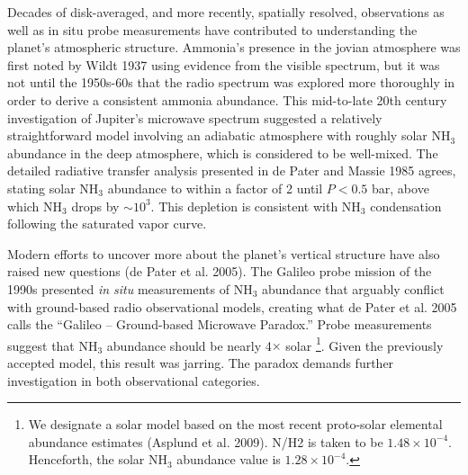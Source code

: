 \documentclass{article}
\newcommand{\e}[1]{\times 10^{#1}}
\begin{document}
	Decades of disk-averaged, and more recently, spatially resolved, observations as well as in situ probe measurements have contributed to understanding the planet's atmospheric structure.
	Ammonia's presence in the jovian atmosphere was first noted by Wildt 1937 using evidence from the visible spectrum, but it was not until the 1950s-60s that the radio spectrum was explored more thoroughly in order to derive a consistent ammonia abundance.
	This mid-to-late 20th century investigation of Jupiter's microwave spectrum suggested a relatively straightforward model involving an adiabatic atmosphere with roughly solar NH$_{3}$ abundance in the deep atmosphere, which is considered to be well-mixed.
	The detailed radiative transfer analysis presented in de Pater and Massie 1985 agrees, stating solar NH$_{3}$ abundance to within a factor of 2 until $P < 0.5$ bar, above which NH$_{3}$ drops by $\sim 10^{3}$.
	This depletion is consistent with NH$_{3}$ condensation following the saturated vapor curve.

	Modern efforts to uncover more about the planet’s vertical structure have also raised new questions (de Pater et al. 2005).
	The Galileo probe mission of the 1990s presented {\sl in situ} measurements of NH$_{3}$ abundance that arguably conflict with ground-based radio observational models, creating what de Pater et al. 2005 calls the ``Galileo – Ground-based Microwave Paradox.''
	Probe measurements suggest that NH$_{3}$ abundance should be nearly 4$\times$ solar
		\footnote{We designate a solar model based on the most recent proto-solar elemental abundance estimates (Asplund et al. 2009). N/H2 is taken to be $1.48 \e{-4}$. Henceforth, the solar NH$_{3}$ abundance value is $1.28 \e{-4}$.}. 
	Given the previously accepted model, this result was jarring.
	The paradox demands further investigation in both observational categories.
\end{document}
